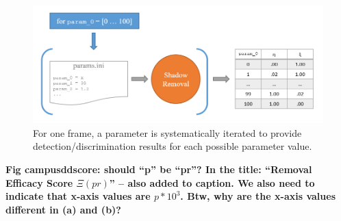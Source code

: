\documentclass[12pt]{report}
\newcommand{\comment}[1]
           {\par {\bfseries \color{blue} #1 \par}}
\begin{document}
\begin{figure}
  \centering
 \includegraphics[width=1\linewidth]{figures/gui_iterate.png}
  \caption{For one frame, a parameter is systematically iterated to provide detection/discrimination results for each possible parameter value.}
  \label{fig:guiiterate}
\end{figure}

\comment{Fig campusddscore: should ``p'' be ``pr''?  In the title: ``Removal Efficacy Score $\Xi(pr)$'' -- also added to caption. We also need to indicate that x-axis values are $p*10^{3}$. Btw, why are the x-axis values different in (a) and (b)? }
\end{document}
